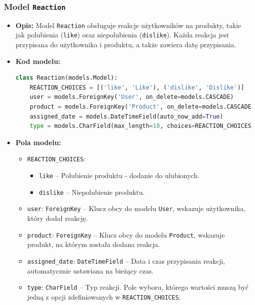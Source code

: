 \documentclass[12pt,a4paper,oneside]{article}
\theoremstyle{definition}
\numberwithin{equation}{section}
\begin{document}
\subsubsection{Model \texttt{Reaction}}
\begin{itemize}
    \item \textbf{Opis:} Model \texttt{Reaction} obsługuje reakcje użytkowników na produkty, 
    takie jak polubienia (\texttt{like}) oraz niepolubienia (\texttt{dislike}). 
    Każda reakcja jest przypisana do użytkownika i produktu, a także zawiera datę przypisania.
    \item \textbf{Kod modelu:}
    \begin{lstlisting}[language=Python, caption=Model \texttt{Reaction}]
class Reaction(models.Model):
    REACTION_CHOICES = [('like', 'Like'), ('dislike', 'Dislike')]
    user = models.ForeignKey('User', on_delete=models.CASCADE)
    product = models.ForeignKey('Product', on_delete=models.CASCADE)
    assigned_date = models.DateTimeField(auto_now_add=True)
    type = models.CharField(max_length=10, choices=REACTION_CHOICES)
    \end{lstlisting}
    
    \item \textbf{Pola modelu:}
    \begin{itemize}
        \item \texttt{REACTION\_CHOICES}:
        \begin{itemize}
            \item \texttt{like} – Polubienie produktu - dodanie do ulubionych.
            \item \texttt{dislike} – Niepolubienie produktu.
        \end{itemize}
        \item \texttt{user}: \texttt{ForeignKey} – Klucz obcy do modelu \texttt{User}, wskazuje użytkownika, który dodał reakcję.
        \item \texttt{product}: \texttt{ForeignKey} – Klucz obcy do modelu \texttt{Product}, wskazuje produkt, na którym została dodana reakcja.
        \item \texttt{assigned\_date}: \texttt{DateTimeField} – Data i czas przypisania reakcji, automatycznie ustawiana na bieżący czas.
        \item \texttt{type}: \texttt{CharField} – Typ reakcji. Pole wyboru, którego wartości muszą być jedną z opcji zdefiniowanych w \texttt{REACTION\_CHOICES}.
    \end{itemize}
\end{itemize}
\end{document}
